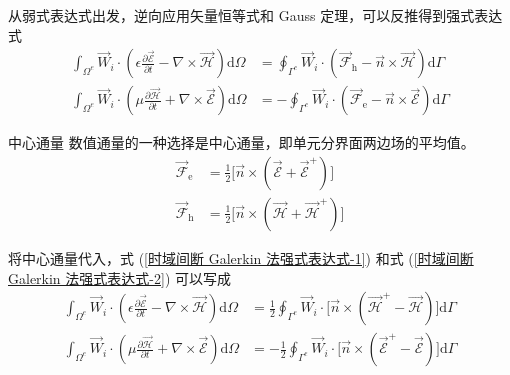 \begin{solution}
    从弱式表达式出发，逆向应用矢量恒等式和 Gauss 定理，可以反推得到强式表达式
    \begin{align*}
        \int_{\Omega^e}\vec{W}_i\cdot\left(
            \epsilon\frac{\partial\vec{\mathscr{E}}}{\partial t}
            -\nabla\times\vec{\mathscr{H}}
        \right)\text{d}\Omega
        &=\oint_{\Gamma^e}\vec{W}_i\cdot
        (\vec{\mathscr{F}}_{\text{h}}-\vec{n}\times\vec{\mathscr{H}})\text{d}\Gamma\\
        \int_{\Omega^e}\vec{W}_i\cdot\left(
            \mu\frac{\partial\vec{\mathscr{H}}}{\partial t}
            +\nabla\times\vec{\mathscr{E}}
        \right)\text{d}\Omega
        &=-\oint_{\Gamma^e}\vec{W}_i\cdot
        (\vec{\mathscr{F}}_{\text{e}}-\vec{n}\times\vec{\mathscr{E}})\text{d}\Gamma
    \end{align*}
\end{solution}

\begin{theorem}{中心通量}
    数值通量的一种选择是中心通量，即单元分界面两边场的平均值。
    \begin{align}
        \vec{\mathscr{F}}_{\text{e}}&=\frac{1}{2}
        \Big[\vec{n}\times(\vec{\mathscr{E}}+\vec{\mathscr{E}}^+)\Big]\\
        \vec{\mathscr{F}}_{\text{h}}&=\frac{1}{2}
        \Big[\vec{n}\times(\vec{\mathscr{H}}+\vec{\mathscr{H}}^+)\Big]
    \end{align}
\end{theorem}

\par 将中心通量代入，式 (\ref{时域间断 Galerkin 法强式表达式-1}) 和式 (\ref{时域间断 Galerkin 法强式表达式-2})
可以写成
\begin{align}
    \label{中心通量时域间断 Galerkin 法-1}
    \int_{\Omega^e}\vec{W}_i\cdot\left(
        \epsilon\frac{\partial\vec{\mathscr{E}}}{\partial t}
        -\nabla\times\vec{\mathscr{H}}
    \right)\text{d}\Omega
    &=\frac{1}{2}\oint_{\Gamma^e}\vec{W}_i\cdot
    \Big[\vec{n}\times(\vec{\mathscr{H}}^+-\vec{\mathscr{H}})\Big]
    \text{d}\Gamma\\
    \label{中心通量时域间断 Galerkin 法-2}
    \int_{\Omega^e}\vec{W}_i\cdot\left(
        \mu\frac{\partial\vec{\mathscr{H}}}{\partial t}
        +\nabla\times\vec{\mathscr{E}}
    \right)\text{d}\Omega
    &=-\frac{1}{2}\oint_{\Gamma^e}\vec{W}_i\cdot
    \Big[\vec{n}\times(\vec{\mathscr{E}}^+-\vec{\mathscr{E}})\Big]
    \text{d}\Gamma
\end{align}


